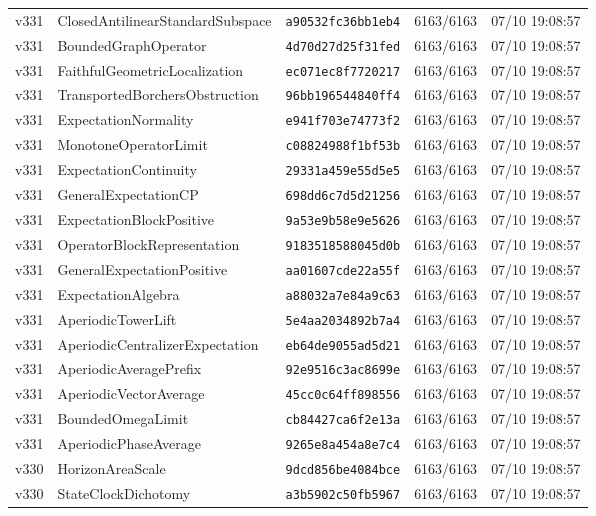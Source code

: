 \documentclass[11pt]{article}
\theoremstyle{definition}\newtheorem{deriv}{Derivação}
\begin{document}
{\begin{longtable}{@{}lllll@{}}
v331 & ClosedAntilinearStandardSubspace & \texttt{a90532fc36bb1eb4} & 6163/6163 & 07/10 19:08:57 \\
v331 & BoundedGraphOperator & \texttt{4d70d27d25f31fed} & 6163/6163 & 07/10 19:08:57 \\
v331 & FaithfulGeometricLocalization & \texttt{ec071ec8f7720217} & 6163/6163 & 07/10 19:08:57 \\
v331 & TransportedBorchersObstruction & \texttt{96bb196544840ff4} & 6163/6163 & 07/10 19:08:57 \\
v331 & ExpectationNormality & \texttt{e941f703e74773f2} & 6163/6163 & 07/10 19:08:57 \\
v331 & MonotoneOperatorLimit & \texttt{c08824988f1bf53b} & 6163/6163 & 07/10 19:08:57 \\
v331 & ExpectationContinuity & \texttt{29331a459e55d5e5} & 6163/6163 & 07/10 19:08:57 \\
v331 & GeneralExpectationCP & \texttt{698dd6c7d5d21256} & 6163/6163 & 07/10 19:08:57 \\
v331 & ExpectationBlockPositive & \texttt{9a53e9b58e9e5626} & 6163/6163 & 07/10 19:08:57 \\
v331 & OperatorBlockRepresentation & \texttt{9183518588045d0b} & 6163/6163 & 07/10 19:08:57 \\
v331 & GeneralExpectationPositive & \texttt{aa01607cde22a55f} & 6163/6163 & 07/10 19:08:57 \\
v331 & ExpectationAlgebra & \texttt{a88032a7e84a9c63} & 6163/6163 & 07/10 19:08:57 \\
v331 & AperiodicTowerLift & \texttt{5e4aa2034892b7a4} & 6163/6163 & 07/10 19:08:57 \\
v331 & AperiodicCentralizerExpectation & \texttt{eb64de9055ad5d21} & 6163/6163 & 07/10 19:08:57 \\
v331 & AperiodicAveragePrefix & \texttt{92e9516c3ac8699e} & 6163/6163 & 07/10 19:08:57 \\
v331 & AperiodicVectorAverage & \texttt{45cc0c64ff898556} & 6163/6163 & 07/10 19:08:57 \\
v331 & BoundedOmegaLimit & \texttt{cb84427ca6f2e13a} & 6163/6163 & 07/10 19:08:57 \\
v331 & AperiodicPhaseAverage & \texttt{9265e8a454a8e7c4} & 6163/6163 & 07/10 19:08:57 \\
v330 & HorizonAreaScale & \texttt{9dcd856be4084bce} & 6163/6163 & 07/10 19:08:57 \\
v330 & StateClockDichotomy & \texttt{a3b5902c50fb5967} & 6163/6163 & 07/10 19:08:57 \\

\end{longtable}}
\end{document}
